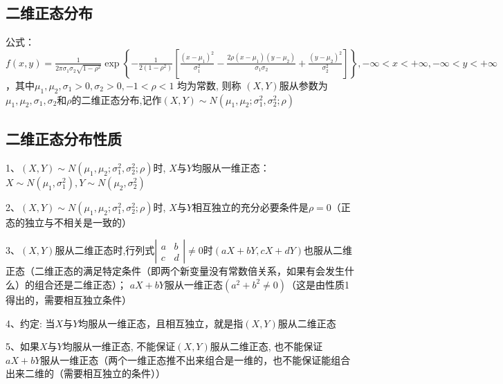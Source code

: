 \subsection{二维正态分布}

公式：$f(x, y)=\frac{1}{2 \pi \sigma_{1} \sigma_{2} \sqrt{1-\rho^{2}}} \exp \left\{-\frac{1}{2\left(1-\rho^{2}\right)}\left[\frac{\left(x-\mu_{1}\right)^{2}}{\sigma_{1}^{2}}-\frac{2 \rho\left(x-\mu_{1}\right)\left(y-\mu_{2}\right)}{\sigma_{1} \sigma_{2}}+\frac{\left(y-\mu_{2}\right)^{2}}{\sigma_{2}^{2}}\right]\right\},-\infty<x<+\infty,-\infty<y<+\infty$，其中$\mu_{1}, \mu_{2}, \sigma_{1}>0, \sigma_{2}>0,-1<\rho<1$ 均为常数, 则称 $(X, Y) $服从参数为$\mu_{1}, \mu_{2}, \sigma_{1}, \sigma_{2}$和$\rho$的二维正态分布,记作$(X, Y) \sim N\left(\mu_{1}, \mu_{2} ; \sigma_{1}^{2}, \sigma_{2}^{2} ; \rho\right)$



\subsection{二维正态分布性质}

1、$\left(X, Y\right) \sim N\left(\mu_{1}, \mu_{2} ; \sigma_{1}^{2}, \sigma_{2}^{2} ; \rho\right)$时, $X$与$Y$均服从一维正态：$X \sim{N}\left(\mu_{1}, \sigma_{1}^{2}\right), Y \sim N\left(\mu_{2}, \sigma_{2}^{2}\right)$

2、$(X, Y) \sim N\left(\mu_{1}, \mu_{2} ; \sigma_{1}^{2}, \sigma_{2}^{2} ; \rho\right)$时, $X$与$Y$相互独立的充分必要条件是$\rho=0$（正态的独立与不相关是一致的）

3、$(X, Y)$服从二维正态时,行列式$\left|\begin{array}{ll}a & b \\ c & d\end{array}\right| \neq 0$时$(a X+b Y, c X+d Y)$也服从二维正态（二维正态的满足特定条件（即两个新变量没有常数倍关系，如果有会发生什么）的组合还是二维正态）； $ a X+b Y$服从一维正态$\left(a^{2}+b^{2} \neq 0\right)$（这是由性质1得出的，需要相互独立条件）

4、约定: 当$X$与$Y$均服从一维正态，且相互独立，就是指$(X, Y)$服从二维正态

5、如果$X$与$Y$均服从一维正态, 不能保证$(X, Y)$服从二维正态, 也不能保证$a X+b Y$服从一维正态（两个一维正态推不出来组合是一维的，也不能保证能组合出来二维的（需要相互独立的条件））

